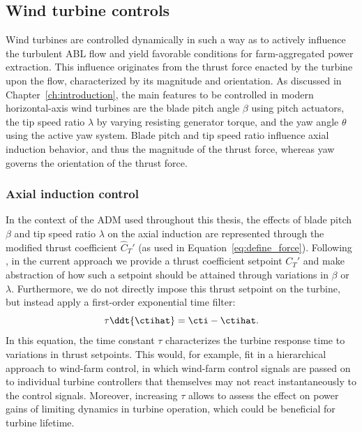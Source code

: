 \subsection{Wind turbine controls}
Wind turbines are controlled dynamically in such a way as to actively influence the turbulent ABL flow and yield favorable conditions for farm-aggregated power extraction. This influence originates from the thrust force enacted by the turbine upon the flow, characterized by its magnitude and orientation. 
As discussed in Chapter~\ref{ch:introduction}, the main features to be controlled in modern horizontal-axis wind turbines are the blade pitch angle $\beta$ using pitch actuators, the tip speed ratio $\lambda$ by varying resisting generator torque, and the yaw angle $\theta$ using the active yaw system. Blade pitch and tip speed ratio influence axial induction behavior, and thus the magnitude of the thrust force, whereas yaw governs the orientation of the thrust force. 

\subsubsection{Axial induction control}
In the context of the ADM used throughout this thesis, the effects of blade pitch $\beta$ and tip speed ratio $\lambda$ on the axial induction are represented through the modified thrust coefficient $\widehat{C}_T'$ (as used in Equation~\ref{eq:define_force}). Following \cite{goit2015optimal}, in the current approach we provide a thrust coefficient setpoint $C_T'$ and make abstraction of how such a setpoint should be attained through variations in $\beta$ or $\lambda$. Furthermore, we do not directly impose this thrust setpoint on the turbine, but instead apply a first-order exponential time filter:
\begin{equation}
	\tau \ddt{\ctihat} = \cti - \ctihat \label{eq:timefilter_def}.
\end{equation}
In this equation, the time constant $\tau$ characterizes the turbine response time to variations in thrust setpoints. This would, for example, fit in a hierarchical approach to wind-farm control, in which wind-farm control signals are passed on to individual turbine controllers that themselves may not react instantaneously to the control signals. Moreover, increasing $\tau$ allows to assess the effect on power gains of limiting dynamics in turbine operation, which could be beneficial for turbine lifetime. 


